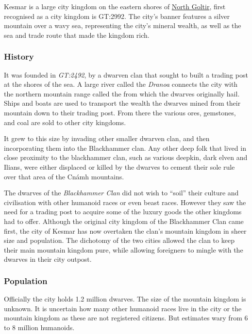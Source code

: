 Kesmar is a large city kingdom on the eastern shores of
\hyperref[sec:Goltir]{North Goltir}, first recognised as a city kingdom is
GT:2992. The city's banner features a silver mountain over a wavy sea,
representing the city's mineral wealth, as well as the sea and trade route
that made the kingdom rich.

\subsubsection{History}

It was founded in \emph{GT:2492}, by a dwarven clan that sought to built a
trading post at the shores of the sea. A large river called the \emph{Dranoa}
connects the city with the northern mountain range called the
 from which the dwarves originally hail. Ships
and boats are used to transport the wealth the dwarves mined from their
mountain down to their trading post. From there the various ores, gemstones,
and coal are sold to other city kingdoms.

It grew to this size by invading other smaller dwarven clan, and then
incorporating them into the Blackhammer clan. Any other deep folk that lived
in close proximity to the blackhammer clan, such as various deepkin, dark
elven and Ilians, were either displaced or killed by the dwarves to cement
their sole rule over that area of the Cnámh mountains.

The dwarves of the \emph{Blackhammer Clan} did not wish to ``soil'' their
culture and civilisation with other humanoid races or even beast
races. However they saw the need for a trading post to acquire some of the
luxury goods the other kingdoms had to offer. Although the original city
kingdom of the Blackhammer Clan came first, the city of Kesmar has now
overtaken the clan's mountain kingdom in sheer size and population. The
dichotomy of the two cities allowed the clan to keep their main mountain
kingdom pure, while allowing foreigners to mingle with the dwarves in their
city outpost.

\subsubsection{Population}

Officially the city holds 1.2 million dwarves. The size of the mountain
kingdom is unknown. It is uncertain how many other humanoid races live in
the city or the mountain kingdom as these are not registered citizens. But
estimates wary from 6 to 8 million humanoids.

